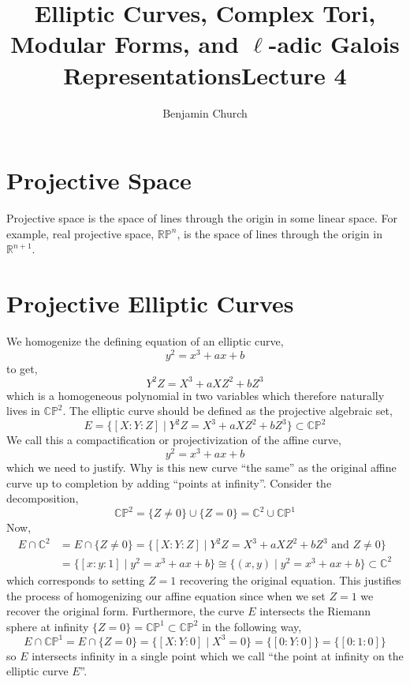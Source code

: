 \documentclass{article}
\title{Elliptic Curves, Complex Tori, Modular Forms, and $\ell$-adic Galois Representations}
\author{Benjamin Church}
\newcommand{\R}{\mathbb{R}}
\newcommand{\C}{\mathbb{C}}
\theoremstyle{definition}
\begin{document}
\title{Lecture 4}

\maketitle

\section{Projective Space}

\newcommand{\RP}{\mathbb{RP}}
\newcommand{\CP}{\mathbb{CP}}

Projective space is the space of lines through the origin in some linear space. For example, real projective space, $\RP^n$, is the space of lines through the origin in $\R^{n+1}$. 

\section{Projective Elliptic Curves}

We homogenize the defining equation of an elliptic curve,
\[ y^2 = x^3 + a x + b \]
to get,
\[ Y^2 Z = X^3 + a X Z^2 + b Z^3 \]
which is a homogeneous polynomial in two variables which therefore naturally lives in $\CP^2$. The elliptic curve should be defined as the projective algebraic set,
\[ E = \{ [X : Y : Z] \mid Y^2 Z = X^3 + a X Z^2 + b Z^3 \} \subset \CP^2 \]
We call this a compactification or projectivization of the affine curve,
\[ y^2 = x^3 + ax + b \]
which we need to justify. Why is this new curve ``the same'' as the original affine curve up to completion by adding ``points at infinity''. Consider the decomposition,
\[ \CP^2 = \{ Z \neq 0 \} \cup \{ Z = 0 \} = \C^2 \cup \CP^1 \]
Now,
\begin{align*}
 E \cap \C^2 & = E \cap \{ Z \neq 0 \} = \{ [X : Y  : Z] \mid Y^2 Z = X^3 + a X Z^2 + b Z^3 \text{ and } Z \neq 0 \} 
\\
& = \{ [x : y : 1] \mid y^2 = x^3 + a x + b \} \cong \{ (x,y) \mid y^2 = x^3 + ax + b \} \subset \C^2
\end{align*}
which corresponds to setting $Z = 1$ recovering the original equation. This justifies the process of homogenizing our affine equation since when we set $Z = 1$ we recover the original form. Furthermore, the curve $E$ intersects the Riemann sphere at infinity $\{ Z = 0 \} = \CP^1 \subset \CP^2$ in the following way,
\[ E \cap \CP^1 = E \cap \{ Z = 0 \} = \{ [X : Y : 0] \mid X^3 = 0 \} = \{ [0 : Y : 0] \} = \{ [0 : 1 : 0] \}
\]
so $E$ intersects infinity in a single point which we call ``the point at infinity on the elliptic curve $E$''. 
\end{document}
